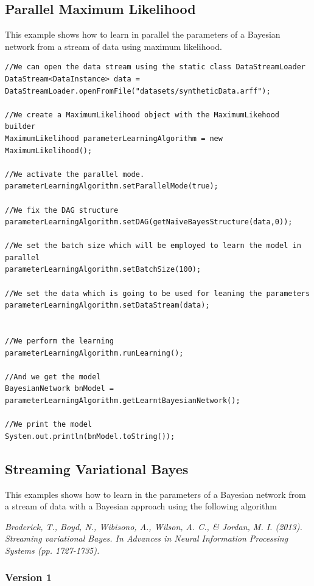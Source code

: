 \subsection{Parallel Maximum Likelihood}

This example shows how to learn in parallel the parameters of a Bayesian network from a stream of data using maximum likelihood.
\begin{lstlisting}
//We can open the data stream using the static class DataStreamLoader
DataStream<DataInstance> data = DataStreamLoader.openFromFile("datasets/syntheticData.arff");

//We create a MaximumLikelihood object with the MaximumLikehood builder
MaximumLikelihood parameterLearningAlgorithm = new MaximumLikelihood();

//We activate the parallel mode.
parameterLearningAlgorithm.setParallelMode(true);

//We fix the DAG structure
parameterLearningAlgorithm.setDAG(getNaiveBayesStructure(data,0));

//We set the batch size which will be employed to learn the model in parallel
parameterLearningAlgorithm.setBatchSize(100);

//We set the data which is going to be used for leaning the parameters
parameterLearningAlgorithm.setDataStream(data);


//We perform the learning
parameterLearningAlgorithm.runLearning();

//And we get the model
BayesianNetwork bnModel = parameterLearningAlgorithm.getLearntBayesianNetwork();

//We print the model
System.out.println(bnModel.toString());
\end{lstlisting}

\subsection{Streaming Variational Bayes}

This examples shows how to learn in the parameters of a Bayesian network from a stream of data with a Bayesian
approach using the following algorithm

\textit{Broderick, T., Boyd, N., Wibisono, A., Wilson, A. C., \& Jordan, M. I. (2013). Streaming variational Bayes. 
In Advances in Neural Information Processing Systems (pp. 1727-1735).
}



\subsubsection*{Version 1}

